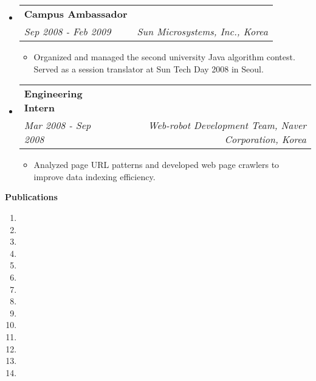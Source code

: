 \documentclass[letterpaper,11pt]{article}
\makeatletter
\newcommand{\resitem}[1]{\item #1 \vspace{-2pt}}
\newcommand{\resheading}[1]{{\large \colorbox{mygrey}{\begin{minipage}{\textwidth}{\textbf{#1 \vphantom{p\^{E}}}}\end{minipage}}}}
\newcommand{\ressubheading}[3]{
\begin{tabular*}{7.0in}{l@{\extracolsep{\fill}}r}
		\textbf{#1} &  \\
		\textit{#3} & \textit{#2}\\
\end{tabular*}\vspace{-6pt}}
\makeatother
\begin{document}
\begin{itemize}
\item
	\ressubheading{Campus Ambassador}{Sun Microsystems, Inc., Korea}{Sep 2008 - Feb 2009}
	\begin{itemize}
		\resitem{Organized and managed the second university Java algorithm contest. Served as a session translator at Sun Tech Day 2008 in Seoul.}
	\end{itemize}

\item
	\ressubheading{Engineering Intern}{Web-robot Development Team, Naver Corporation, Korea}{Mar 2008 - Sep 2008}
	\begin{itemize}
		\resitem{Analyzed page URL patterns and developed web page crawlers to improve data indexing efficiency.}
	\end{itemize}

\end{itemize}




\resheading{Publications}
    \begin{enumerate}
    	\item {}
        \item {}
        \item {}
        \item {}
        \item {}
        \item {}
        \item {}
        \item {}
        \item {}
        \item {}
        \item {}
        \item {}
        \item {}
        \item {}
    \end{enumerate}
\end{document}
